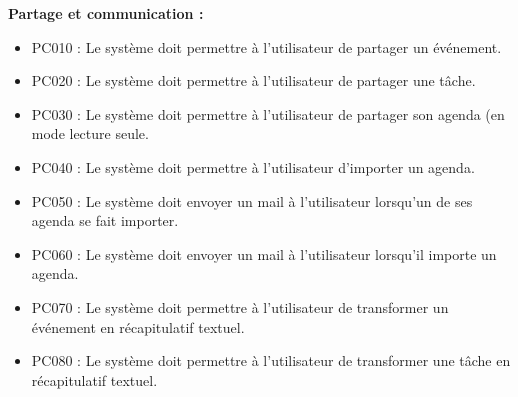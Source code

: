 \documentclass{article}
\begin{document}
\textbf{Partage et communication :}
\begin{itemize}
    \item PC010 : Le système doit permettre à l’utilisateur de partager un événement.
    \item PC020 : Le système doit permettre à l’utilisateur de partager une tâche.
    \item PC030 : Le système doit permettre à l’utilisateur de partager son agenda (en mode lecture seule.
    \item PC040 : Le système doit permettre à l’utilisateur d’importer un agenda.
    \item PC050 : Le système doit envoyer un mail à l’utilisateur lorsqu’un de ses agenda se fait importer.
    \item PC060 : Le système doit envoyer un mail à l’utilisateur lorsqu’il importe un agenda.
    \item PC070 : Le système doit permettre à l’utilisateur de transformer un événement en récapitulatif textuel.
    \item PC080 : Le système doit permettre à l’utilisateur de transformer une tâche en récapitulatif textuel.
\end{itemize}

\newpage
\end{document}
